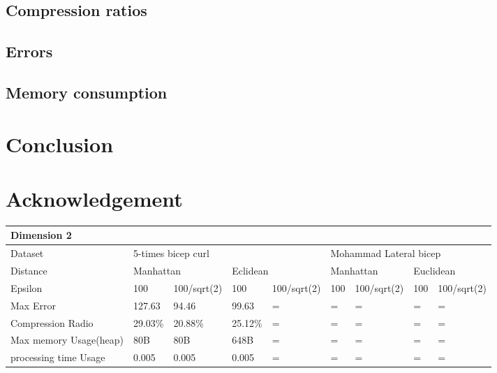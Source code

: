 \documentclass[10pt, conference, compsocconf]{IEEEtran}
\begin{document}
\subsection{Compression ratios}

\subsection{Errors}

\subsection{Memory consumption}

\section{Conclusion}

\section*{Acknowledgement}
\begin{table}[]
    \begin{tabular}{|l|l|l|l|l|l|l|l|l|}
    \hline
    \multicolumn{9}{|l|}{Dimension 2}                                                                                                                         \\ \hline
    Dataset                & \multicolumn{4}{l|}{5-times bicep curl}                        & \multicolumn{4}{l|}{Mohammad Lateral bicep}                     \\ \hline
    Distance               & \multicolumn{2}{l|}{Manhattan} & \multicolumn{2}{l|}{Eclidean} & \multicolumn{2}{l|}{Manhattan} & \multicolumn{2}{l|}{Euclidean} \\ \hline
    Epsilon                & 100          & 100/sqrt(2)     & 100         & 100/sqrt(2)     & 100        & 100/sqrt(2)       & 100        & 100/sqrt(2)       \\ \hline
    Max Error              & 127.63       & 94.46           & 99.63       & =               & =          & =                 & =          & =                 \\ \hline
    Compression Radio      & 29.03\%      & 20.88\%         & 25.12\%     & =               & =          & =                 & =          & =                 \\ \hline
    Max memory Usage(heap) & 80B          & 80B             & 648B        & =               & =          & =                 & =          & =                 \\ \hline
    processing time Usage  & 0.005        & 0.005           & 0.005       & =               & =          & =                 & =          & =                 \\ \hline
    \end{tabular}
\end{table}
\end{document}
